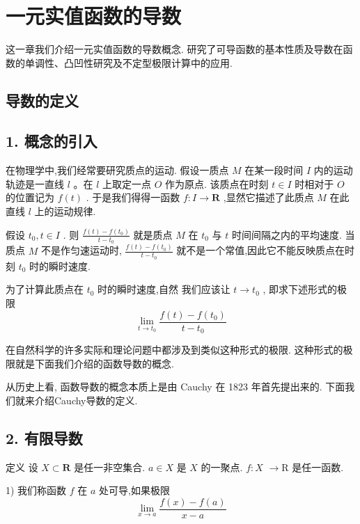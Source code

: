 \chapter{一元实值函数的导数}

这一章我们介绍一元实值函数的导数概念. 研究了可导函数的基本性质及导数在函数的单调性、凸凹性研究及不定型极限计算中的应用.

\section{导数的定义}

\section*{1. 概念的引入}

在物理学中,我们经常要研究质点的运动. 假设一质点 $M$ 在某一段时间 $I$ 内的运动轨迹是一直线 $l$ 。在 $l$ 上取定一点 $O$ 作为原点. 该质点在时刻 $t \in  I$ 时相对于 $O$ 的位置记为 $f\left( t\right)$ . 于是我们得得一函数 $f : I \rightarrow  \mathbf{R}$ ,显然它描述了此质点 $M$ 在此直线 $l$ 上的运动规律.

假设 ${t}_{0},t \in  I$ . 则 $\frac{f\left( t\right)  - f\left( {t}_{0}\right) }{t - {t}_{0}}$ 就是质点 $M$ 在 ${t}_{0}$ 与 $t$ 时间间隔之内的平均速度. 当质点 $M$ 不是作匀速运动时, $\frac{f\left( t\right)  - f\left( {t}_{0}\right) }{t - {t}_{0}}$ 就不是一个常值,因此它不能反映质点在时刻 ${t}_{0}$ 时的瞬时速度.

为了计算此质点在 ${t}_{0}$ 时的瞬时速度,自然 我们应该让 $t \rightarrow  {t}_{0}$ , 即求下述形式的极限
$$\mathop{\lim }\limits_{{t \rightarrow  {t}_{0}}}\frac{f\left( t\right)  - f\left( {t}_{0}\right) }{t - {t}_{0}}$$

在自然科学的许多实际和理论问题中都涉及到类似这种形式的极限. 这种形式的极限就是下面我们介绍的函数导数的概念.

从历史上看, 函数导数的概念本质上是由 Cauchy 在 1823 年首先提出来的. 下面我们就来介绍Cauchy导数的定义.

\section*{2. 有限导数}

定义 设 $X \subset  \mathbf{R}$ 是任一非空集合. $a \in  X$ 是 $X$ 的一聚点. $f : X$  $\rightarrow  \mathrm{R}$ 是任一函数.

1) 我们称函数 $f$ 在 $a$ 处可导,如果极限
$$\mathop{\lim }\limits_{{x \rightarrow  a}}\frac{f\left( x\right)  - f\left( a\right) }{x - a}$$

